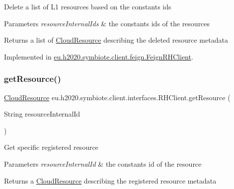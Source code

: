 Delete a list of L1 resources based on the constants ids


\begin{DoxyParams}{Parameters}
{\em resource\+Internal\+Ids} & the constants ids of the resources \\
\hline
\end{DoxyParams}
\begin{DoxyReturn}{Returns}
a list of \hyperlink{}{Cloud\+Resource} describing the deleted resource metadata 
\end{DoxyReturn}


Implemented in \hyperlink{classeu_1_1h2020_1_1symbiote_1_1client_1_1feign_1_1FeignRHClient_ae56343520532a4d10423bfa99d49787f}{eu.\+h2020.\+symbiote.\+client.\+feign.\+Feign\+R\+H\+Client}.

\mbox{\label{interfaceeu_1_1h2020_1_1symbiote_1_1client_1_1interfaces_1_1RHClient_a13899a508ce181ceafd5e04fe5147a4a}} 
\subsubsection{\texorpdfstring{get\+Resource()}{getResource()}}
{\footnotesize\ttfamily \hyperlink{classeu_1_1h2020_1_1symbiote_1_1cloud_1_1model_1_1internal_1_1CloudResource}{Cloud\+Resource} eu.\+h2020.\+symbiote.\+client.\+interfaces.\+R\+H\+Client.\+get\+Resource (\begin{DoxyParamCaption}\item[{String}]{resource\+Internal\+Id }\end{DoxyParamCaption})}

Get specific registered resource


\begin{DoxyParams}{Parameters}
{\em resource\+Internal\+Id} & the constants id of the resource \\
\hline
\end{DoxyParams}
\begin{DoxyReturn}{Returns}
a \hyperlink{}{Cloud\+Resource} describing the registered resource metadata 
\end{DoxyReturn}


